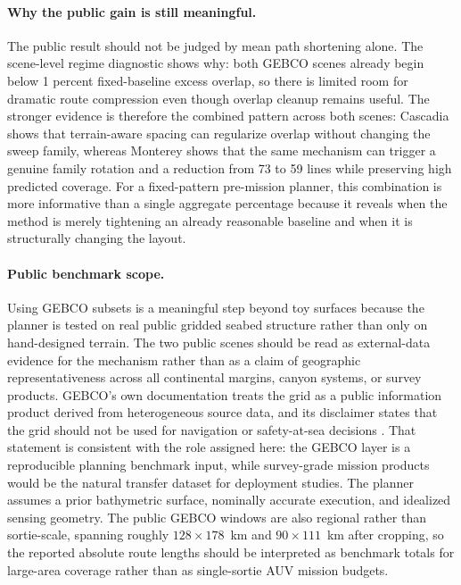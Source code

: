 \documentclass[jmse,article,submit,moreauthors]{Definitions/mdpi}
\begin{document}
\paragraph{Why the public gain is still meaningful.}
The public result should not be judged by mean path shortening alone. The scene-level regime diagnostic shows why: both GEBCO scenes already begin below 1 percent fixed-baseline excess overlap, so there is limited room for dramatic route compression even though overlap cleanup remains useful. The stronger evidence is therefore the combined pattern across both scenes: Cascadia shows that terrain-aware spacing can regularize overlap without changing the sweep family, whereas Monterey shows that the same mechanism can trigger a genuine family rotation and a reduction from 73 to 59 lines while preserving high predicted coverage. For a fixed-pattern pre-mission planner, this combination is more informative than a single aggregate percentage because it reveals when the method is merely tightening an already reasonable baseline and when it is structurally changing the layout.

\paragraph{Public benchmark scope.}
Using GEBCO subsets is a meaningful step beyond toy surfaces because the planner is tested on real public gridded seabed structure rather than only on hand-designed terrain. The two public scenes should be read as external-data evidence for the mechanism rather than as a claim of geographic representativeness across all continental margins, canyon systems, or survey products. GEBCO's own documentation treats the grid as a public information product derived from heterogeneous source data, and its disclaimer states that the grid should not be used for navigation or safety-at-sea decisions \cite{gebco2025grid}. That statement is consistent with the role assigned here: the GEBCO layer is a reproducible planning benchmark input, while survey-grade mission products would be the natural transfer dataset for deployment studies. The planner assumes a prior bathymetric surface, nominally accurate execution, and idealized sensing geometry. The public GEBCO windows are also regional rather than sortie-scale, spanning roughly $128 \times 178$~km and $90 \times 111$~km after cropping, so the reported absolute route lengths should be interpreted as benchmark totals for large-area coverage rather than as single-sortie AUV mission budgets.
\end{document}
